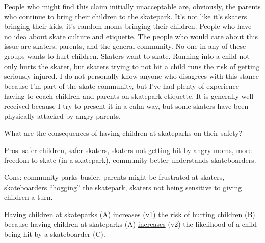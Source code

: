 \documentclass[12pt]{article}
\begin{document}
People who might find this claim initially unacceptable are, obviously, the parents who continue to bring their children to the skatepark. It's not like it's skaters bringing their kids, it's random moms bringing their children. People who have no idea about skate culture and etiquette. The people who would care about this issue are skaters, parents, and the general community. No one in any of these groups wants to hurt children. Skaters want to skate. Running into a child not only hurts the skater, but skaters trying to not hit a child runs the risk of getting seriously injured. I do not personally know anyone who disagrees with this stance because I'm part of the skate community, but I've had plenty of experience having to coach children and parents on skatepark etiquette. It is generally well-received because I try to present it in a calm way, but some skaters have been physically attacked by angry parents.


What are the consequences of having children at skateparks on their safety?

Pros: safer children, safer skaters, skaters not getting hit by angry moms, more freedom to skate (in a skatepark), community better understands skateboarders.

Cons: community parks busier, parents might be frustrated at skaters, skateboarders ``hogging'' the skatepark, skaters not being sensitive to giving children a turn.

Having children at skateparks (A) \uline{increases} (v1) the risk of hurting children (B) because having children at skateparks (A) \uline{increases} (v2) the likelihood of a child being hit by a skateboarder (C).

\end{document}
